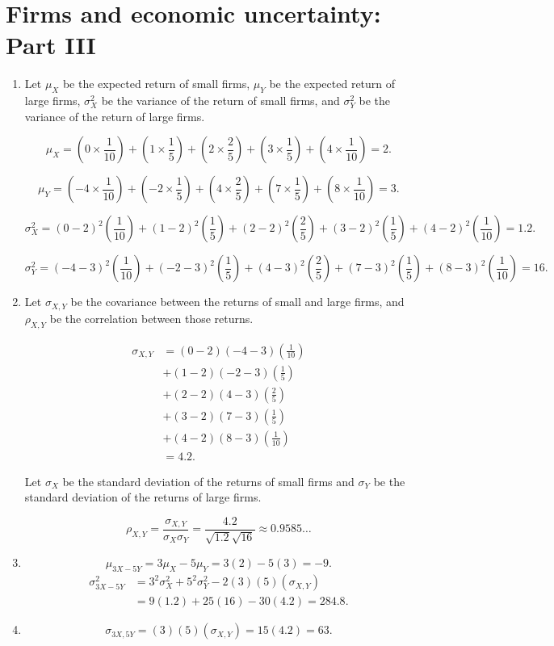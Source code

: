 \documentclass[12pt]{article}
\begin{document}
\section{Firms and economic uncertainty: Part III}
\begin{enumerate}
\item Let $\mu_X$ be the expected return of small firms, $\mu_Y$ be the expected return of large firms, $\sigma^2_X$ be the variance of the return of small firms, and $\sigma^2_Y$ be the variance of the return of large firms.

\[\mu_X=\left(0\times\frac{1}{10}\right)+\left(1\times\frac{1}{5}\right)+\left(2\times\frac{2}{5}\right)+\left(3\times\frac{1}{5}\right)+\left(4\times\frac{1}{10}\right)=2.\]

\[\mu_Y=\left(-4\times\frac{1}{10}\right)+\left(-2\times\frac{1}{5}\right)+\left(4\times\frac{2}{5}\right)+\left(7\times\frac{1}{5}\right)+\left(8\times\frac{1}{10}\right)=3.\]

\[\sigma^2_X=(0-2)^2\left(\frac{1}{10}\right)+(1-2)^2\left(\frac{1}{5}\right)+(2-2)^2\left(\frac{2}{5}\right)+(3-2)^2\left(\frac{1}{5}\right)+(4-2)^2\left(\frac{1}{10}\right)=1.2.\]

\[\sigma^2_Y=(-4-3)^2\left(\frac{1}{10}\right)+(-2-3)^2\left(\frac{1}{5}\right)+(4-3)^2\left(\frac{2}{5}\right)+(7-3)^2\left(\frac{1}{5}\right)+(8-3)^2\left(\frac{1}{10}\right)=16.\]
\item Let $\sigma_{X,Y}$ be the covariance between the returns of small and large firms, and $\rho_{X,Y}$ be the correlation between those returns.

\begin{align*}
\sigma_{X,Y}&=(0-2)(-4-3)\left(\frac{1}{10}\right)\\
&+(1-2)(-2-3)\left(\frac{1}{5}\right)\\
&+(2-2)(4-3)\left(\frac{2}{5}\right)\\
&+(3-2)(7-3)\left(\frac{1}{5}\right)\\
&+(4-2)(8-3)\left(\frac{1}{10}\right)\\
&=4.2.
\end{align*}

Let $\sigma_X$ be the standard deviation of the returns of small firms and $\sigma_Y$ be the standard deviation of the returns of large firms.

\[\rho_{X,Y}=\frac{\sigma_{X,Y}}{\sigma_X\sigma_Y}=\frac{4.2}{\sqrt{1.2}\sqrt{16}}\approx 0.9585\dots\]
\item\[\mu_{3X-5Y}=3\mu_X-5\mu_Y=3(2)-5(3)=-9.\]
\begin{align*}
\sigma^2_{3X-5Y}
&=3^2\sigma^2_X+5^2\sigma^2_Y-2(3)(5)(\sigma_{X,Y})\\
&=9(1.2)+25(16)-30(4.2)=284.8.
\end{align*}
\item\[\sigma_{3X,5Y}=(3)(5)(\sigma_{X,Y})=15(4.2)=63.\]


\end{enumerate}
\end{document}
